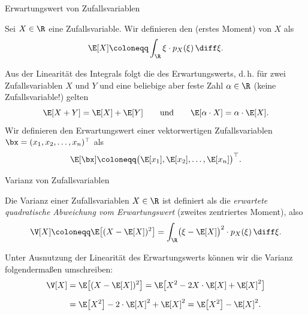 \begin{frame}{Erwartungswert von Zufallsvariablen}{}
	\begin{mydef}
		Sei $X \in \R$ eine Zufallsvariable. Wir definieren den  (erstes Moment) von $X$ als
		\begin{equation*}
			\E[X] \coloneqq \int_{\R} \xi \cdot p_X(\xi)\,\diff\xi.
		\end{equation*}
	\end{mydef}

	Aus der Linearität des Integrals folgt die des Erwartungswerts, d.\,h. für zwei Zufallsvariablen $X$ und $Y$
	und eine beliebige aber feste Zahl $\alpha \in \R$ (keine Zufallsvariable!) gelten
	\begin{equation*}
		\E[X + Y] = \E[X] + \E[Y] \qquad\text{und}\qquad \E[\alpha \cdot X] = \alpha \cdot \E[X].
	\end{equation*}
	Wir definieren den Erwartungswert einer vektorwertigen Zufallsvariablen $\bx = (x_1, x_2, \ldots, x_n)^\top$ als
	\begin{equation*}
		\E[\bx] \coloneqq \bigl( \E[x_1], \E[x_2], \ldots, \E[x_n] \bigr)^\top.
	\end{equation*}
\end{frame}


\begin{frame}{Varianz von Zufallsvariablen}{}
	\begin{mydef}
		Die Varianz einer Zufallsvariablen $X \in \R$ ist definiert als die \textit{erwartete quadratische Abweichung
		vom Erwartungswert} (zweites zentriertes Moment), also
		\begin{equation*}
			\V[X] \coloneqq \E\bigl[ (X - \E[X])^2 \bigr] = \int_\R \bigl( \xi - \E[X] \bigr)^2 \cdot p_X(\xi)\,\diff\xi.
		\end{equation*}
	\end{mydef}

	Unter Ausnutzung der Linearität des Erwartungswerts können wir die Varianz folgendermaßen umschreiben:
	\begin{align*}
		\V[X]
			&= \E\bigl[ (X - \E[X])^2 \bigr] = \E\bigl[ X^2 - 2X \cdot \E[X] + \E[X]^2 \bigr]
	\\[2mm]
			&= \E\bigl[ X^2 \bigr] - 2 \cdot \E[X]^2 + \E[X]^2
				= \E\bigl[ X^2 \bigr] - \E[X]^2.
	\end{align*}
\end{frame}


